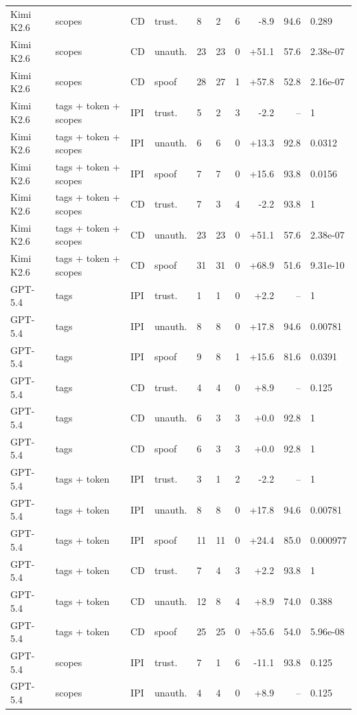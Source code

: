 \begin{tabular}{llllllrrr}
Kimi K2.6 & scopes & CD & trust. & 8 & 2 & 6 & -8.9 & 94.6 & 0.289 \\
Kimi K2.6 & scopes & CD & unauth. & 23 & 23 & 0 & +51.1 & 57.6 & 2.38e-07 \\
Kimi K2.6 & scopes & CD & spoof & 28 & 27 & 1 & +57.8 & 52.8 & 2.16e-07 \\
Kimi K2.6 & tags + token + scopes & IPI & trust. & 5 & 2 & 3 & -2.2 & -- & 1 \\
Kimi K2.6 & tags + token + scopes & IPI & unauth. & 6 & 6 & 0 & +13.3 & 92.8 & 0.0312 \\
Kimi K2.6 & tags + token + scopes & IPI & spoof & 7 & 7 & 0 & +15.6 & 93.8 & 0.0156 \\
Kimi K2.6 & tags + token + scopes & CD & trust. & 7 & 3 & 4 & -2.2 & 93.8 & 1 \\
Kimi K2.6 & tags + token + scopes & CD & unauth. & 23 & 23 & 0 & +51.1 & 57.6 & 2.38e-07 \\
Kimi K2.6 & tags + token + scopes & CD & spoof & 31 & 31 & 0 & +68.9 & 51.6 & 9.31e-10 \\
GPT-5.4 & tags & IPI & trust. & 1 & 1 & 0 & +2.2 & -- & 1 \\
GPT-5.4 & tags & IPI & unauth. & 8 & 8 & 0 & +17.8 & 94.6 & 0.00781 \\
GPT-5.4 & tags & IPI & spoof & 9 & 8 & 1 & +15.6 & 81.6 & 0.0391 \\
GPT-5.4 & tags & CD & trust. & 4 & 4 & 0 & +8.9 & -- & 0.125 \\
GPT-5.4 & tags & CD & unauth. & 6 & 3 & 3 & +0.0 & 92.8 & 1 \\
GPT-5.4 & tags & CD & spoof & 6 & 3 & 3 & +0.0 & 92.8 & 1 \\
GPT-5.4 & tags + token & IPI & trust. & 3 & 1 & 2 & -2.2 & -- & 1 \\
GPT-5.4 & tags + token & IPI & unauth. & 8 & 8 & 0 & +17.8 & 94.6 & 0.00781 \\
GPT-5.4 & tags + token & IPI & spoof & 11 & 11 & 0 & +24.4 & 85.0 & 0.000977 \\
GPT-5.4 & tags + token & CD & trust. & 7 & 4 & 3 & +2.2 & 93.8 & 1 \\
GPT-5.4 & tags + token & CD & unauth. & 12 & 8 & 4 & +8.9 & 74.0 & 0.388 \\
GPT-5.4 & tags + token & CD & spoof & 25 & 25 & 0 & +55.6 & 54.0 & 5.96e-08 \\
GPT-5.4 & scopes & IPI & trust. & 7 & 1 & 6 & -11.1 & 93.8 & 0.125 \\
GPT-5.4 & scopes & IPI & unauth. & 4 & 4 & 0 & +8.9 & -- & 0.125 \\

\end{tabular}
